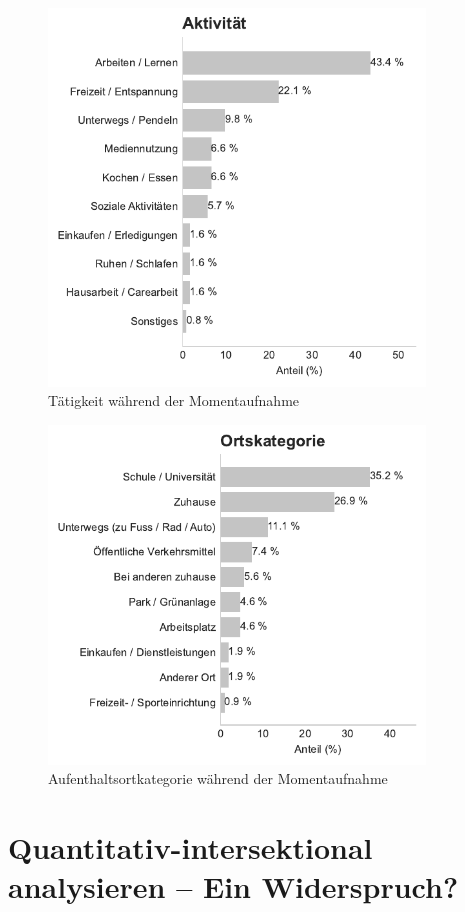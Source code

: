 \begin{figure}[h]
    \centering
    \includegraphics[width=10cm]{analysis/plots/cat_dist_activity.pdf}
    \caption{Tätigkeit während der Momentaufnahme}
    \label{fig:survey_activities}
\end{figure}

\begin{figure}[h]
    \centering
    \includegraphics[width=10cm]{analysis/plots/cat_dist_location_category.pdf}
    \caption{Aufenthaltsortkategorie während der Momentaufnahme}
    \label{fig:survey_locations}
\end{figure}


\section{Quantitativ-intersektional analysieren -- Ein Widerspruch?}

